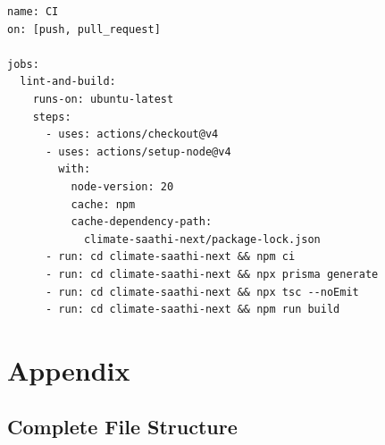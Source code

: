\documentclass[12pt,a4paper]{report}
\begin{document}
\begin{lstlisting}[caption={.github/workflows/ci.yml}]
name: CI
on: [push, pull_request]

jobs:
  lint-and-build:
    runs-on: ubuntu-latest
    steps:
      - uses: actions/checkout@v4
      - uses: actions/setup-node@v4
        with:
          node-version: 20
          cache: npm
          cache-dependency-path:
            climate-saathi-next/package-lock.json
      - run: cd climate-saathi-next && npm ci
      - run: cd climate-saathi-next && npx prisma generate
      - run: cd climate-saathi-next && npx tsc --noEmit
      - run: cd climate-saathi-next && npm run build
\end{lstlisting}

\chapter{Appendix}

\section{Complete File Structure}
\end{document}
